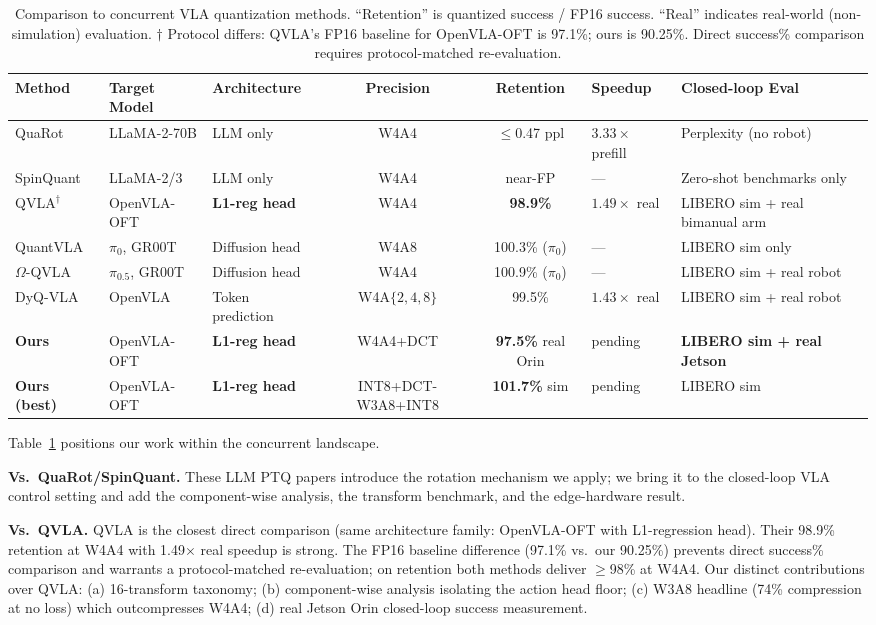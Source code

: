 \documentclass[conference]{IEEEtran}
\begin{document}
\begin{table}[t]\centering\small
\caption{Comparison to concurrent VLA quantization methods. ``Retention'' is quantized
success / FP16 success. ``Real'' indicates real-world (non-simulation) evaluation.
$\dagger$ Protocol differs: QVLA's FP16 baseline for OpenVLA-OFT is 97.1\%; ours is 90.25\%.
Direct success\% comparison requires protocol-matched re-evaluation.}
\label{tab:comparison}
\begin{tabular}{p{2.0cm}p{2.2cm}p{1.6cm}ccp{1.5cm}p{1.8cm}}
\toprule
Method & Target Model & Architecture & Precision & Retention & Speedup & Closed-loop Eval \\
\midrule
QuaRot~\cite{quarot} & LLaMA-2-70B & LLM only & W4A4 & $\leq$0.47 ppl & $3.33\times$ prefill & Perplexity (no robot) \\
SpinQuant~\cite{spinquant} & LLaMA-2/3 & LLM only & W4A4 & near-FP & --- & Zero-shot benchmarks only \\
\midrule
QVLA$^\dagger$~\cite{qvla} & OpenVLA-OFT & \textbf{L1-reg head} & W4A4 & \textbf{98.9\%} & $1.49\times$ real & LIBERO sim + real bimanual arm \\
QuantVLA~\cite{quantvla} & $\pi_0$, GR00T & Diffusion head & W4A8 & 100.3\% ($\pi_0$) & --- & LIBERO sim only \\
$\Omega$-QVLA~\cite{omegaqvla} & $\pi_{0.5}$, GR00T & Diffusion head & W4A4 & 100.9\% ($\pi_0$) & --- & LIBERO sim + real robot \\
DyQ-VLA~\cite{dyqvla} & OpenVLA & Token prediction & W4A$\{2,4,8\}$ & 99.5\% & $1.43\times$ real & LIBERO sim + real robot \\
\midrule
\textbf{Ours} & OpenVLA-OFT & \textbf{L1-reg head} & W4A4+DCT & \textbf{97.5\%} real Orin & pending & \textbf{LIBERO sim + real Jetson} \\
\textbf{Ours (best)} & OpenVLA-OFT & \textbf{L1-reg head} & INT8+DCT-W3A8+INT8 & \textbf{101.7\%} sim & pending & LIBERO sim \\
\bottomrule
\end{tabular}
\end{table}

Table~\ref{tab:comparison} positions our work within the concurrent landscape.

\textbf{Vs.\ QuaRot/SpinQuant.} These LLM PTQ papers introduce the rotation mechanism we
apply; we bring it to the closed-loop VLA control setting and add the component-wise analysis,
the transform benchmark, and the edge-hardware result.

\textbf{Vs.\ QVLA.} QVLA is the closest direct comparison (same architecture family:
OpenVLA-OFT with L1-regression head). Their 98.9\% retention at W4A4 with 1.49$\times$
real speedup is strong. The FP16 baseline difference (97.1\% vs.\ our 90.25\%) prevents
direct success\% comparison and warrants a protocol-matched re-evaluation; on retention
both methods deliver $\geq$98\% at W4A4. Our distinct contributions over QVLA: (a) 16-transform
taxonomy; (b) component-wise analysis isolating the action head floor; (c) W3A8 headline
(74\% compression at no loss) which outcompresses W4A4; (d) real Jetson Orin closed-loop
success measurement.
\end{document}
